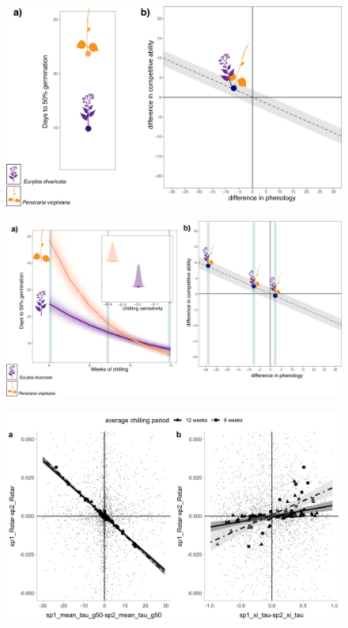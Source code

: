 \documentclass{article}[12pt]
\begin{document}
\begin{figure}[h!]
  \centering
 \includegraphics[width=\textwidth]{..//plots/prief_meangerm.png}
    \caption{}
    \label{Fig:means}
\end{figure}


\begin{figure}[h!]
  \centering
 \includegraphics[width=\textwidth]{..//plots/prief_sense.png}
    \caption{}
    \label{Fig:sensy}
\end{figure}


\begin{figure}[h!]
  \centering
 \includegraphics[width=\textwidth]{..//plots/coexistance_runner_new.jpeg}
    \caption{}
    \label{Fig:coexistence}
\end{figure}
\end{document}
